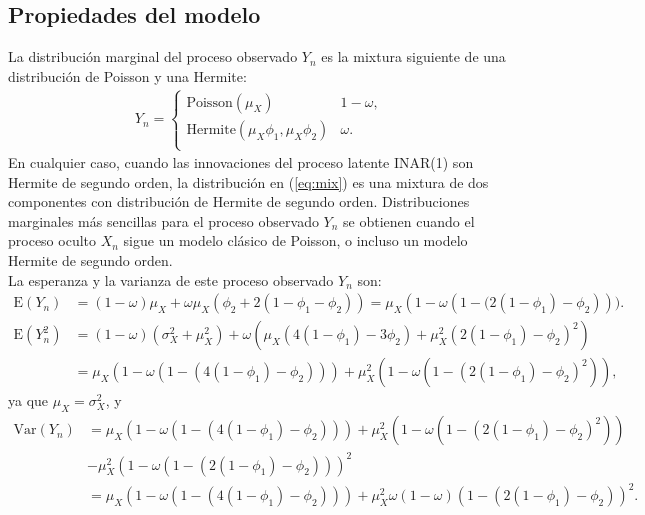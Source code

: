 \documentclass[12pt,twoside]{article} %
\begin{document}
\subsection{Propiedades del modelo}

\medskip

\noindent La distribución marginal del proceso observado $Y_n$ es la mixtura siguiente de una distribución de Poisson y una Hermite:
\begin{align}\label{eq:mix}
Y_n=\begin{cases} 
\textrm{Poisson}(\mu_X) &  1-\omega, \\
\textrm{Hermite}\left(\mu_X\phi_1,\mu_X\phi_2\right) &  \omega. \\
\end{cases}
\end{align}
En cualquier caso, cuando las innovaciones del proceso latente INAR(1) son Hermite de segundo orden, la distribución en (\ref{eq:mix}) es una mixtura de dos componentes con distribución de Hermite de segundo orden. Distribuciones marginales más sencillas para el proceso observado $Y_n$ se obtienen cuando el proceso oculto $X_n$ sigue un modelo clásico de Poisson, o incluso un modelo Hermite de segundo orden.\\ 
La esperanza y la varianza de este proceso observado $Y_n$ son:
\begin{align*}
\textrm{E}(Y_n)&=(1-\omega)\mu_X+\omega\mu_X\left(\phi_2+2(1-\phi_1-\phi_2)\right)=\mu_X(1-\omega\left(1-(2(1-\phi_1)-\phi_2\right))).\\
\textrm{E}(Y_n^2)&=(1-\omega)(\sigma_X^2+\mu_X^2)+\omega \left(\mu_X(4(1-\phi_1)-3\phi_2)+\mu_X^2(2(1-\phi_1)-\phi_2)^2\right)\\&=\mu_X\left(1-\omega\left(1-\left(4(1-\phi_1)-\phi_2\right)\right)\right)+\mu_X^2\left(1-\omega\left(1-(2(1-\phi_1)-\phi_2)^2\right)\right),
\end{align*}
ya que $\mu_X=\sigma_X^2$, y 
\begin{align*}
\textrm{Var}(Y_n)&=\mu_X\left(1-\omega\left(1-\left(4\left(1-\phi_1\right)-\phi_2\right)\right)\right)+\mu_X^2\left(1-\omega\left(1-\left(2\left(1-\phi_1\right)-\phi_2\right)^2\right)\right)\\ &-\mu_X^2\left(1-\omega\left(1-\left(2\left(1-\phi_1\right)-\phi_2\right)\right)\right)^2\\&=\mu_X\left(1-\omega\left(1-\left(4\left(1-\phi_1\right)-\phi_2\right)\right)\right)+\mu_X^2\omega(1-\omega)\left(1-\left(2\left(1-\phi_1\right)-\phi_2\right)\right)^2. 
\end{align*}
\end{document}
